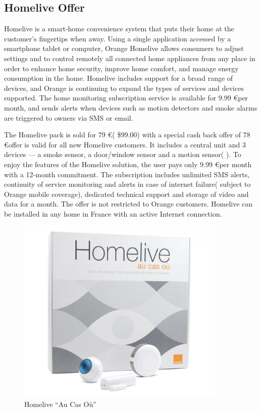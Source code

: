 \subsection{Homelive Offer}

Homelive is a smart-home convenience system that puts their home at the customer’s fingertips when away. Using a single application accessed by a smartphone tablet or computer, Orange Homelive allows consumers to adjust settings and to control remotely all connected home appliances from any place in order to enhance home security, improve home comfort, and manage energy consumption in the home. Homelive includes support for a broad range of devices, and Orange is continuing to expand the types of services and devices supported. The home monitoring subscription service is available for 9.99 \euro per month, and sends alerts when devices such as motion detectors and smoke alarms are triggered to owners via SMS or email.

The Homelive pack is sold for 79 \euro ( \$99.00) with a special cash back offer of 78 \euro  offer is valid for all new Homelive customers. It includes a central unit and 3 devices — a smoke sensor, a door/window sensor and a motion sensor( ). To enjoy the features of the Homelive solution, the user pays only 9.99 \euro  per month with a 12-month commitment. The subscription includes unlimited SMS alerts, continuity of service monitoring and alerts in case of internet failure( subject to Orange mobile coverage), dedicated technical support and storage of video and data for a month. The offer is not restricted to Orange customers. Homelive can be installed in any home in France with an active Internet connection.%

\begin{figure}[htbp]
	\centering
		\includegraphics[width=10cm]{Figures/Pack_Accesoires_Homelive.jpg}
	\caption[Homelive ``Au Cas Où'']{Homelive ``Au Cas Où''}%
	\label{fig:1}
\end{figure}

